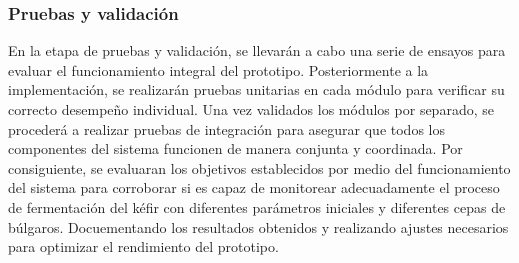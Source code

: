 \subsubsection{Pruebas y validación}
En la etapa de pruebas y validación, se llevarán a cabo una serie de ensayos para evaluar el funcionamiento
integral del prototipo.
Posteriormente a la implementación, se realizarán pruebas unitarias en cada módulo para verificar su correcto desempeño individual.
Una vez validados los módulos por separado, se procederá a realizar pruebas de integración para asegurar
que todos los componentes del sistema funcionen de manera conjunta y coordinada.
Por consiguiente, se evaluaran los objetivos establecidos por medio del funcionamiento del sistema para corroborar 
si es capaz de monitorear adecuadamente el proceso de fermentación del kéfir con diferentes parámetros iniciales y diferentes cepas de búlgaros.
Docuementando los resultados obtenidos y realizando ajustes necesarios para optimizar el rendimiento del prototipo.




